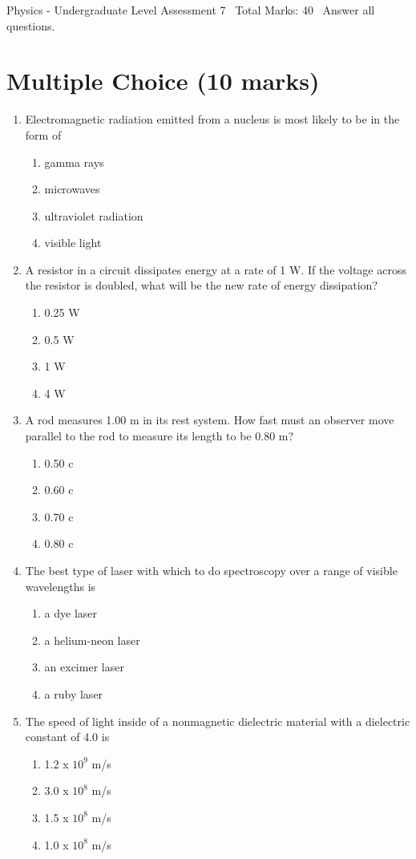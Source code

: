 \documentclass[12pt]{article}
\begin{document}
\begin{center}
Physics - Undergraduate Level Assessment 7 \
Total Marks: 40 \
Answer all questions.
\end{center}

\section*{Multiple Choice (10 marks)}
\begin{enumerate}[label=\arabic*.]
\item Electromagnetic radiation emitted from a nucleus is most likely to be in the form of
\begin{enumerate}[label=(\alph*)]
    \item gamma rays
    \item microwaves
    \item ultraviolet radiation
    \item visible light
\end{enumerate}
\item A resistor in a circuit dissipates energy at a rate of 1 W. If the voltage across the resistor is doubled, what will be the new rate of energy dissipation?
\begin{enumerate}[label=(\alph*)]
    \item 0.25 W
    \item 0.5 W
    \item 1 W
    \item 4 W
\end{enumerate}
\item A rod measures 1.00 m in its rest system. How fast must an observer move parallel to the rod to measure its length to be 0.80 m?
\begin{enumerate}[label=(\alph*)]
    \item 0.50 c
    \item 0.60 c
    \item 0.70 c
    \item 0.80 c
\end{enumerate}
\item The best type of laser with which to do spectroscopy over a range of visible wavelengths is
\begin{enumerate}[label=(\alph*)]
    \item a dye laser
    \item a helium-neon laser
    \item an excimer laser
    \item a ruby laser
\end{enumerate}
\item The speed of light inside of a nonmagnetic dielectric material with a dielectric constant of 4.0 is
\begin{enumerate}[label=(\alph*)]
    \item 1.2 x $10^9$ m/s
    \item 3.0 x $10^8$ m/s
    \item 1.5 x $10^8$ m/s
    \item 1.0 x $10^8$ m/s
\end{enumerate}
\end{enumerate}
\end{document}
